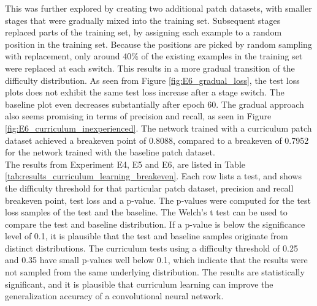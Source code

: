 This was further explored by creating two additional patch datasets, with smaller stages that were gradually mixed into the training set. Subsequent stages replaced parts of the training set, by assigning each example to a random position in the training set. Because the positions are picked by random sampling with replacement, only around 40\% of the existing examples in the training set were replaced at each switch. This results in a more gradual transition of the difficulty distribution. As seen from Figure \ref{fig:E6_gradual_loss}, the test loss plots does not exhibit the same test loss increase after a stage switch. The baseline plot even decreases substantially after epoch 60. The gradual approach also seems promising in terms of precision and recall, as seen in Figure \ref{fig:E6_curriculum_inexperienced}. The network trained with a curriculum patch dataset achieved a breakeven point of 0.8088, compared to a breakeven of 0.7952 for the network trained with the baseline patch dataset.\\



The results from Experiment E4, E5 and E6, are listed in Table \ref{tab:results_curriculum_learning_breakeven}. Each row lists a test, and shows the difficulty threshold for that particular patch dataset, precision and recall breakeven point, test loss and a p-value. The p-values were computed for the test loss samples of the test and the baseline. The Welch's t test can be used to compare the test and baseline distribution. If a p-value is below the significance level of 0.1, it is plausible that the test and baseline samples originate from distinct distributions. The curriculum tests using a difficulty threshold of 0.25 and 0.35 have small p-values well below 0.1, which indicate that the results were not sampled from the same underlying distribution. The results are statistically significant, and it is plausible that curriculum learning can improve the generalization accuracy of a convolutional neural network. \\


